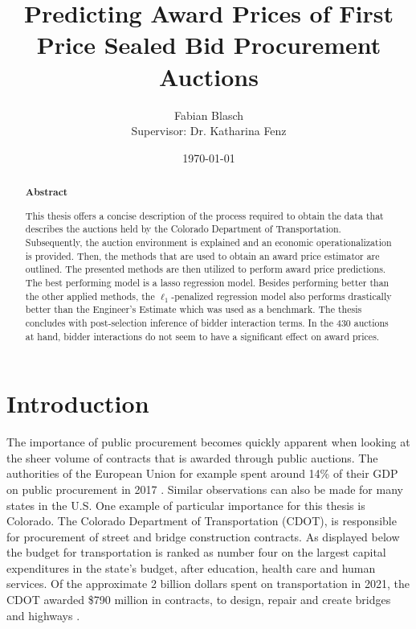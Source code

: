 \documentclass[a4paper,12pt, headsepline]{scrartcl}
\title{Predicting Award Prices of First Price Sealed Bid Procurement Auctions}
\date{\today}
\author{Fabian Blasch\\[0.4cm]{Supervisor: Dr. Katharina Fenz}}
\numberwithin{equation}{section}
\begin{document}
\begin{titlingpage}
\maketitle
\begin{abstract}
\begin{center}
	\textbf{Abstract}
\end{center}
\vspace*{2pt}
This thesis offers a concise description of the process required to obtain the data that describes the auctions held by the Colorado Department of Transportation. Subsequently, the auction environment is explained and an economic operationalization is provided. Then, the methods that are used to obtain an award price estimator are outlined. The presented methods are then utilized to perform award price predictions. The best performing model is a lasso regression model. Besides performing better than the other applied methods, the $\ell_1$-penalized regression model also performs drastically better than the Engineer's Estimate which was used as a benchmark. The thesis concludes with post-selection inference of bidder interaction terms. In the 430 auctions at hand, bidder interactions do not seem to have a significant effect on award prices.
\end{abstract}
\end{titlingpage}
\newpage
\tableofcontents
\thispagestyle{empty}
\clearpage
{} 

\section{Introduction}\label{sec:int}
The importance of public procurement becomes quickly apparent when looking at the sheer volume of contracts that is awarded through public auctions. The authorities of the European Union for example spent around 14\% of their GDP on public procurement in 2017 \citep{GarciaRodriguez2020}. Similar observations can also be made for many states in the U.S. One example of particular importance for this thesis is Colorado. The Colorado Department of Transportation (CDOT), is responsible for procurement of street and bridge construction contracts. As displayed below the budget for transportation is ranked as number four on the largest capital expenditures in the state's budget, after education, health care and human services. Of the approximate 2 billion dollars spent on transportation in 2021, the CDOT awarded \$790 million in contracts, to design, repair and create bridges and highways \citep{CDOTPRes}.
\end{document}
